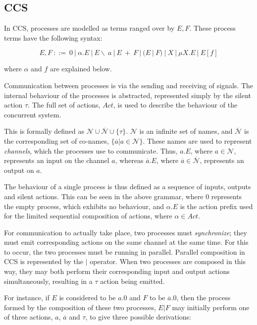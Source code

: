 \subsection{CCS}
\label{ccs}

In CCS, processes are modelled as terms ranged over by $E, F$.  These
process terms have the following syntax:

\begin{equation}
\label{ccssyntax}
  E, F\ ::=\ 
  0\ |\ 
  \alpha.E\ |\ 
  E\backslash\ a\ |\ 
  E\ +\ F\ |\ 
  (E\ |\ F)\ |\ 
  X\ |\ 
  \mu X.E\ |\ 
  E[f] 
\end{equation}

\noindent where $\alpha$ and $f$ are explained below.

Communication between processes is via the sending and receiving of
signals.  The internal behaviour of the processes is abstracted,
represented simply by the silent action $\tau$.  The full set of
actions, $Act$, is used to describe the behaviour of the concurrent
system.

This is formally defined as $\mathcal{N} \cup \overline{\mathcal{N}}
\cup \{\tau\}$.  $\mathcal{N}$ is an infinite set of names, and
$\overline{\mathcal{N}}$ is the corresponding set of co-names,
$\{\overline{a} | a \in \mathcal{N}\}$.  These names are used to
represent \emph{channels}, which the processes use to communicate.
Thus, $a.E$, where $a \in \mathcal{N}$, represents an input on the
channel $a$, whereas $\overline{a}.E$, where $\overline{a} \in
\overline{\mathcal{N}}$, represents an output on $a$.  

The behaviour of a single process is thus defined as a sequence of
inputs, outputs and silent actions. This can be seen in the above
grammar, where $0$ represents the empty process, which exhibits no
behaviour, and $\alpha.E$ is the action prefix used for the limited
sequential composition of actions, where $\alpha \in Act$.

For communication to actually take place, two processes must
\emph{synchronize}; they must emit corresponding actions on the same
channel at the same time.  For this to occur, the two processes must be
running in parallel.  Parallel composition in CCS is represented by the
$|$ operator.  When two processes are composed in this way, they may
both perform their corresponding input and output actions
simultaneously, resulting in a $\tau$ action being emitted.

For instance, if $E$ is considered to be $a.0$ and $F$ to be
$\overline{a}.0$, then the process formed by the composition of these
two processes, $E|F$ may initially perform one of three actions, $a$,
$\overline{a}$ and $\tau$, to give three possible derivations:

